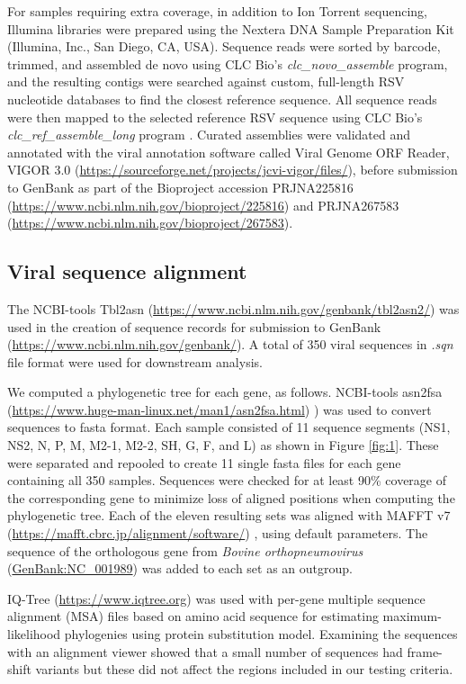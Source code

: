 \documentclass{article} %
\begin{document}
For samples requiring extra coverage, in addition to Ion Torrent sequencing, Illumina libraries were prepared using the Nextera DNA Sample Preparation Kit (Illumina, Inc., San Diego, CA, USA). Sequence reads were sorted by barcode, trimmed, and assembled de novo using CLC Bio’s \textit{clc\_novo\_assemble} program, and the resulting contigs were searched against custom, full-length RSV nucleotide databases to find the closest reference sequence. 
All sequence reads were then mapped to the selected reference RSV sequence using CLC Bio’s \textit{clc\_ref\_assemble\_long} program 
\citep{bioWhite2016}.
Curated assemblies were validated and annotated with the viral annotation software called Viral Genome ORF Reader, VIGOR 3.0 (\url{https://sourceforge.net/projects/jcvi-vigor/files/}), before submission to GenBank as part of the Bioproject accession PRJNA225816 (\url{https://www.ncbi.nlm.nih.gov/bioproject/225816})
\citep{wang_vigor_2012} 
and PRJNA267583 (\url{https://www.ncbi.nlm.nih.gov/bioproject/267583}).

\subsection{Viral sequence alignment}
The NCBI-tools Tbl2asn (\url{https://www.ncbi.nlm.nih.gov/genbank/tbl2asn2/})
was used in the creation of sequence records for submission to GenBank (\url{https://www.ncbi.nlm.nih.gov/genbank/}).
A total of 350 viral sequences in \textit{.sqn} file format were used for downstream analysis.

We computed a phylogenetic tree for each gene, as follows. NCBI-tools asn2fsa  (\url{https://www.huge-man-linux.net/man1/asn2fsa.html}) ) was used to convert sequences to fasta format. Each sample consisted of 11 sequence segments (NS1, NS2, N, P, M, M2-1, M2-2, SH, G, F, and L) as shown in Figure \ref{fig:1}. 
These were separated and repooled to create 11 single fasta files for each gene containing all 350 samples. 
Sequences were checked for at least 90\% coverage of the corresponding gene to minimize loss of aligned positions when computing the phylogenetic tree. Each of the eleven resulting sets was aligned with MAFFT v7 (\url{https://mafft.cbrc.jp/alignment/software/})
\citep{katoh2013mafft},
using default parameters. The sequence of the orthologous gene from \textit{Bovine orthopneumovirus} 
(\href{https://www.ncbi.nlm.nih.gov/nuccore/NC_001989}{GenBank:NC\_001989}) 
was added to each set as an outgroup. 

IQ-Tree 
(\url{https://www.iqtree.org})
\citep{nguyen2015iq}
was used with per-gene multiple sequence alignment (MSA) files based on amino acid sequence for estimating maximum-likelihood phylogenies using protein substitution model.
Examining the sequences with an alignment viewer showed that a small number of sequences had frame-shift variants but these did not affect the regions included in our testing criteria.
\end{document}

